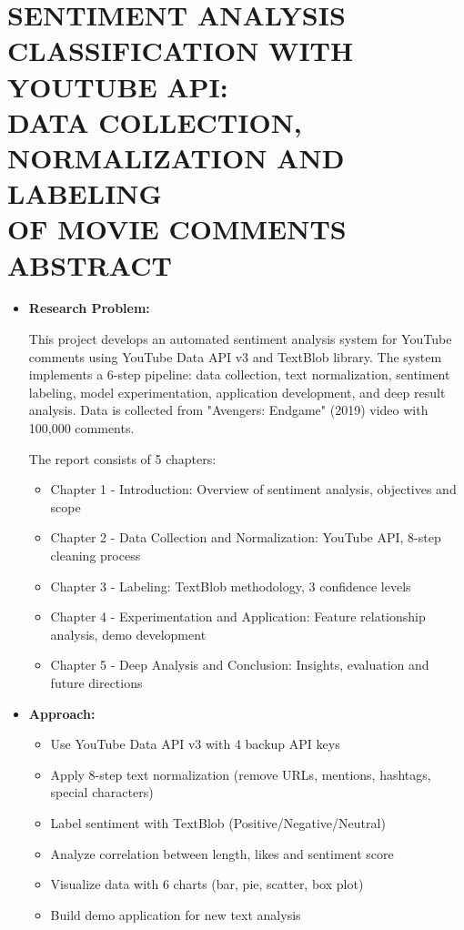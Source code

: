\section*{\fontsize{16pt}{15pt}\selectfont SENTIMENT ANALYSIS CLASSIFICATION WITH YOUTUBE API: \\DATA COLLECTION, NORMALIZATION AND LABELING \\OF MOVIE COMMENTS \\ABSTRACT}

\begin{itemize}
    \item[-] \textbf{Research Problem:}
    
    This project develops an automated sentiment analysis system for YouTube comments using YouTube Data API v3 and TextBlob library. The system implements a 6-step pipeline: data collection, text normalization, sentiment labeling, model experimentation, application development, and deep result analysis. Data is collected from "Avengers: Endgame" (2019) video with 100,000 comments.
    
    The report consists of 5 chapters:
        \begin{itemize}
        \item[•] Chapter 1 - Introduction: Overview of sentiment analysis, objectives and scope
        \item[•] Chapter 2 - Data Collection and Normalization: YouTube API, 8-step cleaning process
        \item[•] Chapter 3 - Labeling: TextBlob methodology, 3 confidence levels
        \item[•] Chapter 4 - Experimentation and Application: Feature relationship analysis, demo development
        \item[•] Chapter 5 - Deep Analysis and Conclusion: Insights, evaluation and future directions
        \end{itemize}
        
    \item[-] \textbf{Approach:}
        \begin{itemize}
        \item[•] Use YouTube Data API v3 with 4 backup API keys
        \item[•] Apply 8-step text normalization (remove URLs, mentions, hashtags, special characters)
        \item[•] Label sentiment with TextBlob (Positive/Negative/Neutral)
        \item[•] Analyze correlation between length, likes and sentiment score
        \item[•] Visualize data with 6 charts (bar, pie, scatter, box plot)
        \item[•] Build demo application for new text analysis
        \end{itemize}
        

\end{itemize}

